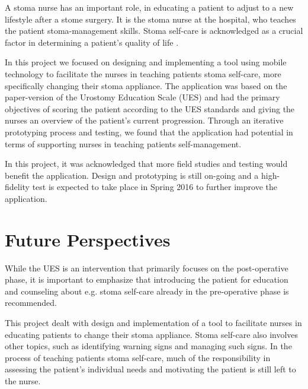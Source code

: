 A stoma nurse has an important role, in educating a patient to adjust to a new lifestyle after a stome surgery. It is the stoma nurse at the hospital, who teaches the patient stoma-management skills. Stoma self-care is acknowledged as a crucial factor in determining a patient's quality of life \citep{piwonka}. 

In this project we focused on designing and implementing a tool using mobile technology to facilitate the nurses in teaching patients stoma self-care, more specifically changing their stoma appliance. The application was based on the paper-version of the Urostomy Education Scale (UES) and had the primary objectives of scoring the patient according to the UES standards and giving the nurses an overview of the patient's current progression. Through an iterative prototyping process and testing, we found that the application had potential in terms of supporting nurses in teaching patients self-management. 

In this project, it was acknowledged that more field studies and testing would benefit the application. Design and prototyping is still on-going and a high-fidelity test is expected to take place in Spring 2016 to further improve the application. 





%


\section{Future Perspectives}
While the UES is an intervention that primarily focuses on the post-operative phase, it is important to emphasize that introducing the patient for education and counseling about e.g. stoma self-care already in the pre-operative phase is recommended. 

This project dealt with design and implementation of a tool to facilitate nurses in educating patients to change their stoma appliance. Stoma self-care also involves other topics, such as identifying warning signs and managing such signs. In the process of teaching patients stoma self-care, much of the responsibility in assessing the patient's individual needs and motivating the patient is still left to the nurse. 

